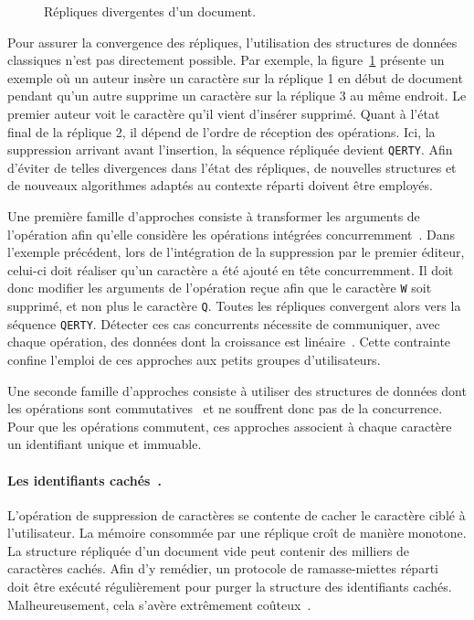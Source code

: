 \begin{figure}
  
  \caption{\label{intro:fig:ripconvergence} Répliques divergentes d'un
    document.}
\end{figure}

Pour assurer la convergence des répliques, l'utilisation des structures de
données \og classiques \fg n'est pas directement possible. %
Par exemple, la figure~\ref{intro:fig:ripconvergence} présente un exemple où un
auteur insère un caractère sur la réplique 1 en début de document pendant qu'un
autre supprime un caractère sur la réplique 3 au même endroit. Le premier auteur
voit le caractère qu'il vient d'insérer supprimé. Quant à l'état final de la
réplique 2, il dépend de l'ordre de réception des opérations. Ici, la
suppression arrivant avant l'insertion, la séquence répliquée devient
\texttt{QERTY}.  Afin d'éviter de telles divergences dans l'état des répliques,
de nouvelles structures et de nouveaux algorithmes adaptés au contexte réparti
doivent être employés.

Une première famille d'approches consiste à transformer les arguments de
l'opération afin qu'elle considère les opérations intégrées
concurremment~\cite{sun1998operational}. Dans l'exemple précédent, lors de
l'intégration de la suppression par le premier éditeur, celui-ci doit réaliser
qu'un caractère a été ajouté en tête concurremment. Il doit donc modifier les
arguments de l'opération reçue afin que le caractère \texttt{W} soit supprimé,
et non plus le caractère \texttt{Q}. Toutes les répliques convergent alors vers
la séquence \texttt{QERTY}.  Détecter ces cas concurrents nécessite de
communiquer, avec chaque opération, des données dont la croissance est
linéaire~\cite{charronbost1991concerning, sun2009contextbased}. Cette contrainte
confine l'emploi de ces approches aux petits groupes d'utilisateurs.

Une seconde famille d'approches consiste à utiliser des structures de données
dont les opérations sont commutatives~\cite{shapiro2011conflict} et ne souffrent
donc pas de la concurrence. Pour que les opérations commutent, ces approches
associent à chaque caractère un identifiant unique et immuable.

\paragraph{Les identifiants cachés~\cite{oster2006data}.} L'opération de
suppression de caractères se contente de cacher le caractère ciblé à
l'utilisateur. La mémoire consommée par une réplique croît de manière
monotone. %
La structure répliquée d'un document vide peut contenir des milliers de
caractères cachés.  Afin d'y remédier, un protocole de ramasse-miettes
réparti~\cite{abdullahi1998garbage} doit être exécuté régulièrement pour purger
la structure des identifiants cachés. Malheureusement, cela s'avère extrêmement
coûteux~\cite{abdullahi1998garbage}.

